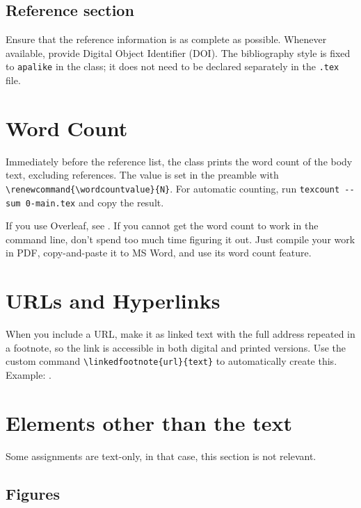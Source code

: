 \documentclass{writtenassignmentchat}
\renewcommand{\wordcountvalue}{000}
\begin{document}
\subsection{Reference section}
Ensure that the reference information is as complete as possible. 
Whenever available, provide Digital Object Identifier (DOI).
The bibliography style is fixed to \texttt{apalike} in the class; it does not need to be
declared separately in the \texttt{.tex} file.



\section{Word Count}
\label{sec:wordcount}

Immediately before the reference list, the class prints the word count of the body text, excluding references. The value is set in the preamble with \verb|\renewcommand{\wordcountvalue}{N}|. 
For automatic counting, run \texttt{texcount -{}-sum 0-main.tex} and copy the result.

If you use Overleaf, see . If you cannot get the word count to work in the command line, don't spend too much time figuring it out. Just compile your work in PDF, copy-and-paste it to MS Word, and use its word count feature.

\section{URLs and Hyperlinks}

When you include a URL, make it as linked text with the full address
repeated in a footnote, so the link is accessible in both digital and printed
versions.
Use the custom command \verb|\linkedfootnote{url}{text}| to automatically create this.
Example: .


\section{Elements other than the text}
Some assignments are text-only, in that case, this section is not relevant.

\subsection{Figures}
\end{document}
